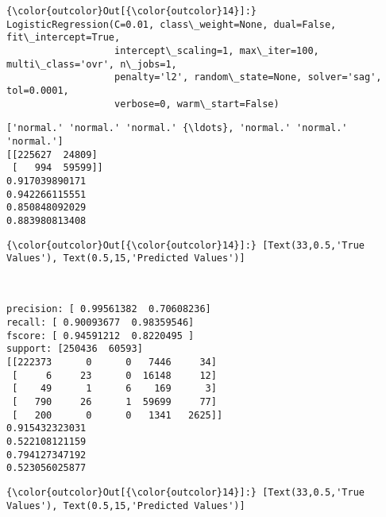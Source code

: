 \documentclass[11pt]{article}
\begin{document}
\begin{Verbatim}[commandchars=\\\{\}]
{\color{outcolor}Out[{\color{outcolor}14}]:} LogisticRegression(C=0.01, class\_weight=None, dual=False, fit\_intercept=True,
                   intercept\_scaling=1, max\_iter=100, multi\_class='ovr', n\_jobs=1,
                   penalty='l2', random\_state=None, solver='sag', tol=0.0001,
                   verbose=0, warm\_start=False)
\end{Verbatim}
            
    \begin{Verbatim}[commandchars=\\\{\}]
['normal.' 'normal.' 'normal.' {\ldots}, 'normal.' 'normal.' 'normal.']
[[225627  24809]
 [   994  59599]]
0.917039890171
0.942266115551
0.850848092029
0.883980813408

    \end{Verbatim}

\begin{Verbatim}[commandchars=\\\{\}]
{\color{outcolor}Out[{\color{outcolor}14}]:} [Text(33,0.5,'True Values'), Text(0.5,15,'Predicted Values')]
\end{Verbatim}
            
    \begin{center}
    \end{center}
    { \hspace*{\fill} \\}
    
    \begin{Verbatim}[commandchars=\\\{\}]
precision: [ 0.99561382  0.70608236]
recall: [ 0.90093677  0.98359546]
fscore: [ 0.94591212  0.8220495 ]
support: [250436  60593]
[[222373      0      0   7446     34]
 [     6     23      0  16148     12]
 [    49      1      6    169      3]
 [   790     26      1  59699     77]
 [   200      0      0   1341   2625]]
0.915432323031
0.522108121159
0.794127347192
0.523056025877

    \end{Verbatim}

\begin{Verbatim}[commandchars=\\\{\}]
{\color{outcolor}Out[{\color{outcolor}14}]:} [Text(33,0.5,'True Values'), Text(0.5,15,'Predicted Values')]
\end{Verbatim}
            
\end{document}
